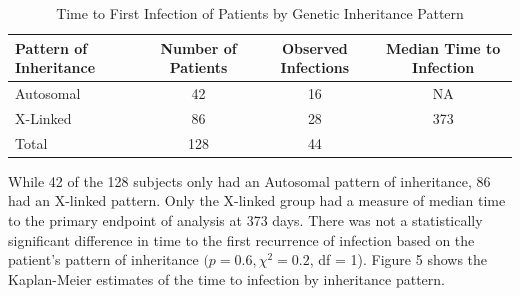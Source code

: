 \documentclass{article}
\begin{document}
	\begin{table}[H]
		\centering
		\footnotesize
		\caption{Time to First Infection of Patients by Genetic Inheritance Pattern}
		\begin{tabular}{lccc}
		\toprule
		\textbf{Pattern of Inheritance} & \textbf{Number of Patients} & \textbf{Observed Infections} & \textbf{Median Time to Infection} \\
		\midrule
		Autosomal & 42 & 16 & NA \\
		X-Linked & 86 & 28 & 373 \\
		\midrule
		Total & 128 & 44 & \\
		\bottomrule
		\end{tabular}
	\end{table}

	While 42 of the 128 subjects only had an Autosomal pattern of inheritance, 86 had an X-linked pattern. Only the X-linked group had a measure of median time to the primary endpoint of analysis at 373 days. There was not a statistically significant difference in time to the first recurrence of infection based on the patient’s pattern of inheritance $(p =0.6, \chi^2 = 0.2$, df = 1). Figure 5 shows the Kaplan-Meier estimates of the time to infection by inheritance pattern.
\end{document}
